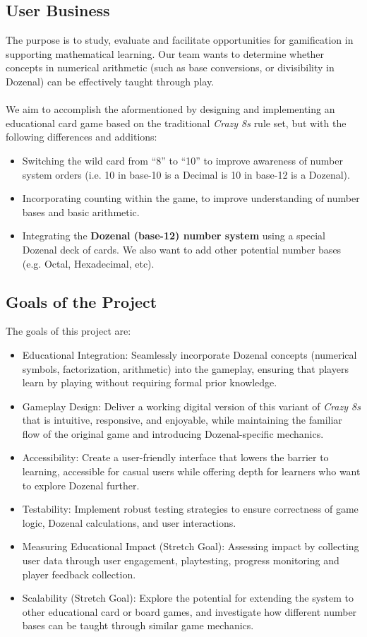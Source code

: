 \documentclass[12pt]{article}
\begin{document}
\subsection{User Business}
The purpose is to study, evaluate and facilitate opportunities for gamification in supporting mathematical learning. Our team wants to determine whether concepts in numerical arithmetic (such as base conversions, or divisibility in Dozenal) can be effectively taught through play.\\\\
We aim to accomplish the aformentioned by designing and implementing an educational card game based on the traditional \textit{Crazy 8s} rule set, but with the following differences and additions:
\begin{itemize}
    \item Switching the wild card from ``8'' to ``10'' to improve awareness of number system orders (i.e. 10 in base-10 is a Decimal is 10 in base-12 is a Dozenal).
    \item Incorporating counting within the game, to improve understanding of number bases and basic arithmetic.
    \item Integrating the \textbf{Dozenal (base-12) number system} using a special Dozenal deck of cards. We also want to add other potential number bases (e.g. Octal, Hexadecimal, etc).
\end{itemize}

\subsection{Goals of the Project}
The goals of this project are:
\begin{itemize}
    \item Educational Integration: Seamlessly incorporate Dozenal concepts (numerical symbols, factorization, arithmetic) into the gameplay, ensuring that players learn by playing without requiring formal prior knowledge.
    \item Gameplay Design: Deliver a working digital version of this variant of \textit{Crazy 8s} that is intuitive, responsive, and enjoyable, while maintaining the familiar flow of the original game and introducing Dozenal-specific mechanics.
    \item Accessibility: Create a user-friendly interface that lowers the barrier to learning, accessible for casual users while offering depth for learners who want to explore Dozenal further.
    \item Testability: Implement robust testing strategies to ensure correctness of game logic, Dozenal calculations, and user interactions.
    \item Measuring Educational Impact (Stretch Goal): Assessing impact by collecting user data through user engagement, playtesting, progress monitoring and player feedback collection.
    \item Scalability (Stretch Goal): Explore the potential for extending the system to other educational card or board games, and investigate how different number bases can be taught through similar game mechanics.
\end{itemize}
\end{document}
